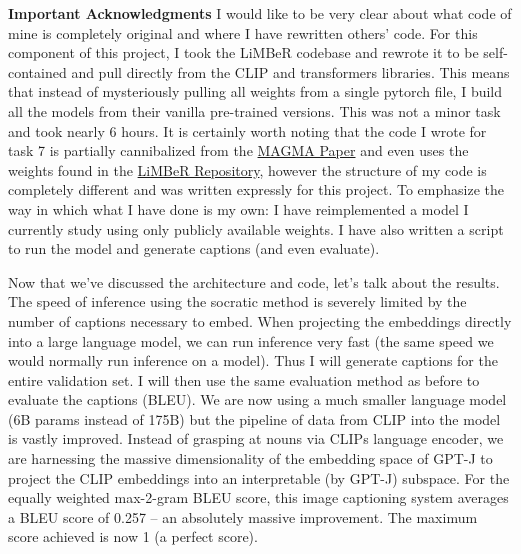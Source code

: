 \documentclass{article}
\begin{document}
\textbf{Important Acknowledgments} I would like to be very clear about what code of mine is completely original and where I have rewritten others' code. For this component of this project, I took the LiMBeR codebase and rewrote it to be self-contained and pull directly from the CLIP and transformers libraries. This means that instead of mysteriously pulling all weights from a single pytorch file, I build all the models from their vanilla pre-trained versions. This was not a minor task and took nearly 6 hours. It is certainly worth noting that the code I wrote for task 7 is partially cannibalized from the \href{https://arxiv.org/abs/2112.05253}{MAGMA Paper} and even uses the weights found in the \href{https://github.com/jmerullo/limber}{LiMBeR Repository}, however the structure of my code is completely different and was written expressly for this project. To emphasize the way in which what I have done is my own: I have reimplemented a model I currently study using only publicly available weights. I have also written a script to run the model and generate captions (and even evaluate).

Now that we've discussed the architecture and code, let's talk about the results. The speed of inference using the socratic method is severely limited by the number of captions necessary to embed. When projecting the embeddings directly into a large language model, we can run inference very fast (the same speed we would normally run inference on a model). Thus I will generate captions for the entire validation set. I will then use the same evaluation method as before to evaluate the captions (BLEU). We are now using a much smaller language model (6B params instead of 175B) but the pipeline of data from CLIP into the model is vastly improved. Instead of grasping at nouns via CLIPs language encoder, we are harnessing the massive dimensionality of the embedding space of GPT-J to project the CLIP embeddings into an interpretable (by GPT-J) subspace. For the equally weighted max-2-gram BLEU score, this image captioning system averages a BLEU score of 0.257 -- an absolutely massive improvement. The maximum score achieved is now 1 (a perfect score).
\end{document}
